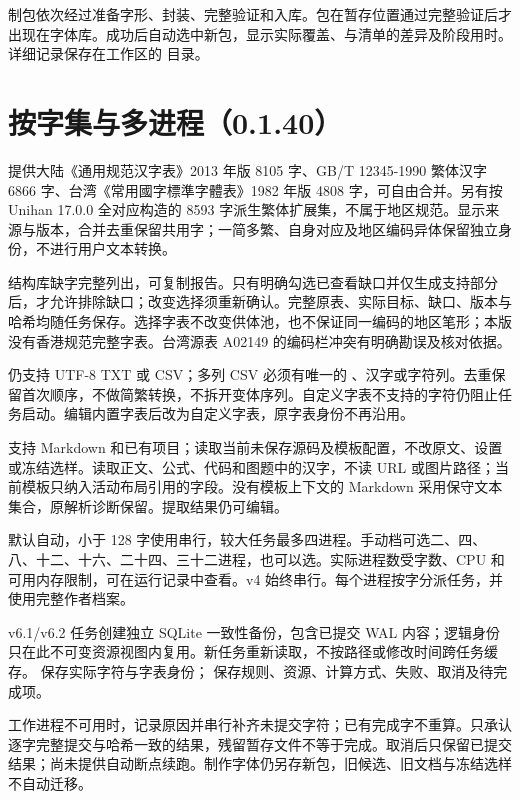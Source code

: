 制包依次经过准备字形、封装、完整验证和入库。包在暂存位置通过完整验证后才出现在字体库。成功后自动选中新包，显示实际覆盖、与清单的差异及阶段用时。详细记录保存在工作区的  目录。

\section{按字集与多进程（0.1.40）}
提供大陆《通用规范汉字表》2013 年版 8105 字、GB/T 12345-1990 繁体汉字 6866 字、台湾《常用國字標準字體表》1982 年版 4808 字，可自由合并。另有按 Unihan 17.0.0 全对应构造的 8593 字派生繁体扩展集，不属于地区规范。显示来源与版本，合并去重保留共用字；一简多繁、自身对应及地区编码异体保留独立身份，不进行用户文本转换。

结构库缺字完整列出，可复制报告。只有明确勾选已查看缺口并仅生成支持部分后，才允许排除缺口；改变选择须重新确认。完整原表、实际目标、缺口、版本与哈希均随任务保存。选择字表不改变供体池，也不保证同一编码的地区笔形；本版没有香港规范完整字表。台湾源表 A02149 的编码栏冲突有明确勘误及核对依据。

仍支持 UTF-8 TXT 或 CSV；多列 CSV 必须有唯一的 、汉字或字符列。去重保留首次顺序，不做简繁转换，不拆开变体序列。自定义字表不支持的字符仍阻止任务启动。编辑内置字表后改为自定义字表，原字表身份不再沿用。

支持 Markdown 和已有项目；读取当前未保存源码及模板配置，不改原文、设置或冻结选样。读取正文、公式、代码和图题中的汉字，不读 URL 或图片路径；当前模板只纳入活动布局引用的字段。没有模板上下文的 Markdown 采用保守文本集合，原解析诊断保留。提取结果仍可编辑。

默认自动，小于 128 字使用串行，较大任务最多四进程。手动档可选二、四、八、十二、十六、二十四、三十二进程，也可以选。实际进程数受字数、CPU 和可用内存限制，可在运行记录中查看。v4 始终串行。每个进程按字分派任务，并使用完整作者档案。

v6.1/v6.2 任务创建独立 SQLite 一致性备份，包含已提交 WAL 内容；逻辑身份只在此不可变资源视图内复用。新任务重新读取，不按路径或修改时间跨任务缓存。 保存实际字符与字表身份； 保存规则、资源、计算方式、失败、取消及待完成项。

工作进程不可用时，记录原因并串行补齐未提交字符；已有完成字不重算。只承认逐字完整提交与哈希一致的结果，残留暂存文件不等于完成。取消后只保留已提交结果；尚未提供自动断点续跑。制作字体仍另存新包，旧候选、旧文档与冻结选样不自动迁移。
